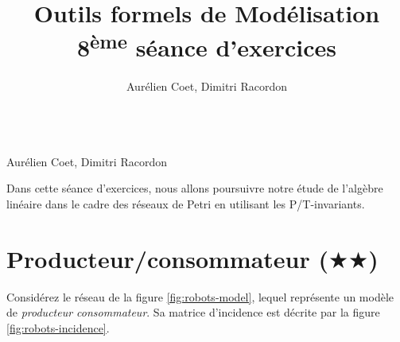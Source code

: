 \documentclass[a4paper, titlepage]{article}
\makeatletter
\numberwithin{figure}{section}
\numberwithin{table}{section}
\newcommand\objective[1]{\def\@objective{#1}}
\newcommand{\makecustomtitle}{%
	\begin{center}
		\huge\@title \\
		[1ex]\small Aurélien Coet, Dimitri Racordon
	\end{center}
	\@objective
}
\makeatother
\begin{document}
\title{Outils formels de Modélisation \\ 8\textsuperscript{ème} séance d'exercices}
\author{Aurélien Coet, Dimitri Racordon}
\objective{
Dans cette séance d'exercices, nous allons poursuivre notre étude de l'algèbre linéaire dans le cadre des réseaux de Petri en utilisant les P/T-invariants.
}

\makecustomtitle

\section{Producteur/consommateur ($\bigstar\bigstar$)}
Considérez le réseau de la figure \ref{fig:robots-model}, lequel représente un modèle de \emph{producteur consommateur}.
Sa matrice d'incidence est décrite par la figure \ref{fig:robots-incidence}.
\end{document}

